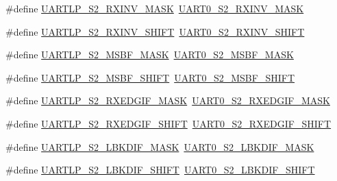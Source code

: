 \begin{DoxyCompactItemize}
\item 
\#define \hyperlink{group___backward___compatibility___symbols_ga5851ca00d46976a2bb09420d5ea14ce0}{U\+A\+R\+T\+L\+P\+\_\+\+S2\+\_\+\+R\+X\+I\+N\+V\+\_\+\+M\+A\+SK}~\hyperlink{group___u_a_r_t0___register___masks_ga81c81000cf5906711578a36178776ae9}{U\+A\+R\+T0\+\_\+\+S2\+\_\+\+R\+X\+I\+N\+V\+\_\+\+M\+A\+SK}
\item 
\#define \hyperlink{group___backward___compatibility___symbols_gafad67c9021f86de6c0d08f8c72457a26}{U\+A\+R\+T\+L\+P\+\_\+\+S2\+\_\+\+R\+X\+I\+N\+V\+\_\+\+S\+H\+I\+FT}~\hyperlink{group___u_a_r_t0___register___masks_ga7c2ed6447fb3c4daa5ed8fd4b29cffca}{U\+A\+R\+T0\+\_\+\+S2\+\_\+\+R\+X\+I\+N\+V\+\_\+\+S\+H\+I\+FT}
\item 
\#define \hyperlink{group___backward___compatibility___symbols_ga41b1656314af8d525f36c119201f43a6}{U\+A\+R\+T\+L\+P\+\_\+\+S2\+\_\+\+M\+S\+B\+F\+\_\+\+M\+A\+SK}~\hyperlink{group___u_a_r_t0___register___masks_ga3d18e7a9445af9999a425598ae57dd1a}{U\+A\+R\+T0\+\_\+\+S2\+\_\+\+M\+S\+B\+F\+\_\+\+M\+A\+SK}
\item 
\#define \hyperlink{group___backward___compatibility___symbols_ga2bfcba2957fb07036e3f1aaacebcfa1a}{U\+A\+R\+T\+L\+P\+\_\+\+S2\+\_\+\+M\+S\+B\+F\+\_\+\+S\+H\+I\+FT}~\hyperlink{group___u_a_r_t0___register___masks_gae193269e5cdcca203195efc7bd5a7e13}{U\+A\+R\+T0\+\_\+\+S2\+\_\+\+M\+S\+B\+F\+\_\+\+S\+H\+I\+FT}
\item 
\#define \hyperlink{group___backward___compatibility___symbols_ga3ff5db6c0a297c27ffc6435304503f4d}{U\+A\+R\+T\+L\+P\+\_\+\+S2\+\_\+\+R\+X\+E\+D\+G\+I\+F\+\_\+\+M\+A\+SK}~\hyperlink{group___u_a_r_t0___register___masks_gaa8912e7668721bb52173cf2d57d9a2df}{U\+A\+R\+T0\+\_\+\+S2\+\_\+\+R\+X\+E\+D\+G\+I\+F\+\_\+\+M\+A\+SK}
\item 
\#define \hyperlink{group___backward___compatibility___symbols_gad414e0468b66c66ff2e90d1f8476c5fe}{U\+A\+R\+T\+L\+P\+\_\+\+S2\+\_\+\+R\+X\+E\+D\+G\+I\+F\+\_\+\+S\+H\+I\+FT}~\hyperlink{group___u_a_r_t0___register___masks_ga0e308d65c84418d41a1e1e7e08d2f49a}{U\+A\+R\+T0\+\_\+\+S2\+\_\+\+R\+X\+E\+D\+G\+I\+F\+\_\+\+S\+H\+I\+FT}
\item 
\#define \hyperlink{group___backward___compatibility___symbols_gaa43c6661dd27a409a7e7e17506c6bfde}{U\+A\+R\+T\+L\+P\+\_\+\+S2\+\_\+\+L\+B\+K\+D\+I\+F\+\_\+\+M\+A\+SK}~\hyperlink{group___u_a_r_t0___register___masks_gac15518365f64c684798c3480deaf83f0}{U\+A\+R\+T0\+\_\+\+S2\+\_\+\+L\+B\+K\+D\+I\+F\+\_\+\+M\+A\+SK}
\item 
\#define \hyperlink{group___backward___compatibility___symbols_ga82b6d0e62d2a3a3eeed35d124fb2b31c}{U\+A\+R\+T\+L\+P\+\_\+\+S2\+\_\+\+L\+B\+K\+D\+I\+F\+\_\+\+S\+H\+I\+FT}~\hyperlink{group___u_a_r_t0___register___masks_gabeff0aee55751aab92571d26a934a04a}{U\+A\+R\+T0\+\_\+\+S2\+\_\+\+L\+B\+K\+D\+I\+F\+\_\+\+S\+H\+I\+FT}

\end{DoxyCompactItemize}
